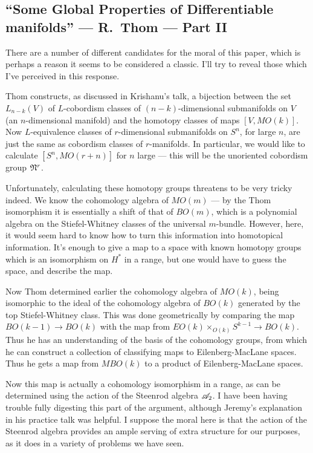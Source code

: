 \documentclass[11pt]{article}
\newcommand{\KanSemResponse}[1]
{
\thispagestyle{fancy}
\section{#1}
}
\begin{document}
\begin{ThomGlobalPropertiesPartTwo}
\KanSemResponse
{``Some Global Properties of Differentiable manifolds'' --- R.\ Thom --- Part II}
There are a number of different candidates for the moral of this paper, which is perhaps a reason it seems to be considered a classic. I'll try to reveal those which I've perceived in this response.

Thom constructs, as discussed in Krishanu's talk, a bijection between the set $L_{n-k}(V)$ of $L$-cobordism classes of $(n-k)$-dimensional submanifolds on $V$ (an $n$-dimensional manifold) and the homotopy classes of maps $[V,MO(k)]$. Now $L$-equivalence classes of $r$-dimensional submanifolds on $S^n$, for large $n$, are just the same as cobordism classes of $r$-manifolds. In particular, we would like to calculate $[S^n,MO(r+n)]$ for $n$ large --- this will be the unoriented cobordism group $\mathfrak{N}^r$.

Unfortunately, calculating these homotopy groups threatens to be very tricky indeed. We know the cohomology algebra of $MO(m)$ --- by the Thom isomorphism it is essentially a shift of that of $BO(m)$, which is a polynomial algebra on the Stiefel-Whitney classes of the universal $m$-bundle. However, here, it would seem hard to know how to turn this information into homotopical information. It's enough to give a map to a space with known homotopy groups which is an isomorphism on $H^*$ in a range, but one would have to guess the space, and describe the map.

Now Thom determined earlier the cohomology algebra of $MO(k)$, being isomorphic to the ideal of the cohomology algebra of $BO(k)$ generated by the top Stiefel-Whitney class. This was done geometrically by comparing the map $BO(k-1)\to BO(k)$ with the map from $EO(k)\times_{O(k)}S^{k-1}\to BO(k)$. Thus he has an understanding of the basis of the cohomology groups, from which he can construct a collection of classifying maps to Eilenberg-MacLane spaces. Thus he gets a map from $MBO(k)$ to a product of Eilenberg-MacLane spaces. 

Now this map is actually a cohomology isomorphism in a range, as can be determined using the action of the Steenrod algebra $\mathscr{A}_2$. I have been having trouble fully digesting this part of the argument, although Jeremy's explanation in his practice talk was helpful. I suppose the moral here is that the action of the Steenrod algebra provides an ample serving of extra structure for our purposes, as it does in a variety of problems we have seen.


\end{ThomGlobalPropertiesPartTwo}
\end{document}
